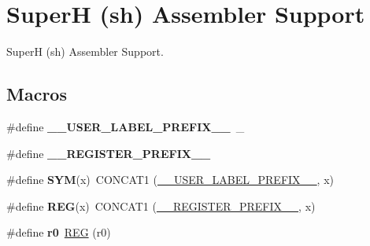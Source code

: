 \hypertarget{group__RTEMSScoreCPUshASM}{}\section{SuperH (sh) Assembler Support}
\label{group__RTEMSScoreCPUshASM}


SuperH (sh) Assembler Support.  


\subsection*{Macros}
\begin{DoxyCompactItemize}
\item 
\mbox{\label{group__RTEMSScoreCPUshASM_gaff6bf0ff0fa3b5cbd23a8ae1131c87a9}} 
\#define {\bfseries \+\_\+\+\_\+\+U\+S\+E\+R\+\_\+\+L\+A\+B\+E\+L\+\_\+\+P\+R\+E\+F\+I\+X\+\_\+\+\_\+}~\+\_\+
\item 
\mbox{\label{group__RTEMSScoreCPUshASM_ga08d4062230ffc8494f4be4f6447497e4}} 
\#define {\bfseries \+\_\+\+\_\+\+R\+E\+G\+I\+S\+T\+E\+R\+\_\+\+P\+R\+E\+F\+I\+X\+\_\+\+\_\+}
\item 
\mbox{\label{group__RTEMSScoreCPUshASM_gafe05d428a5f345f51fb591debb815325}} 
\#define {\bfseries S\+YM}(x)~C\+O\+N\+C\+A\+T1 (\mbox{\hyperlink{group__RTEMSScoreCPUx86-64ASM_gaff6bf0ff0fa3b5cbd23a8ae1131c87a9}{\+\_\+\+\_\+\+U\+S\+E\+R\+\_\+\+L\+A\+B\+E\+L\+\_\+\+P\+R\+E\+F\+I\+X\+\_\+\+\_\+}}, x)
\item 
\mbox{\label{group__RTEMSScoreCPUshASM_gacee196421e9a06f7700bb3064b13b37a}} 
\#define {\bfseries R\+EG}(x)~C\+O\+N\+C\+A\+T1 (\mbox{\hyperlink{group__RTEMSScoreCPUV850ASM_ga08d4062230ffc8494f4be4f6447497e4}{\+\_\+\+\_\+\+R\+E\+G\+I\+S\+T\+E\+R\+\_\+\+P\+R\+E\+F\+I\+X\+\_\+\+\_\+}}, x)
\item 
\mbox{\label{group__RTEMSScoreCPUshASM_gaf8ef4632fb5325a43f9c31778135d450}} 
\#define {\bfseries r0}~\mbox{\hyperlink{group__RTEMSScoreCPUx86-64ASM_gacee196421e9a06f7700bb3064b13b37a}{R\+EG}} (r0)
\item 
\mbox{\label{group__RTEMSScoreCPUshASM_ga7eaf5903abe583c64f4324081140b84e}} 

\end{DoxyCompactItemize}
